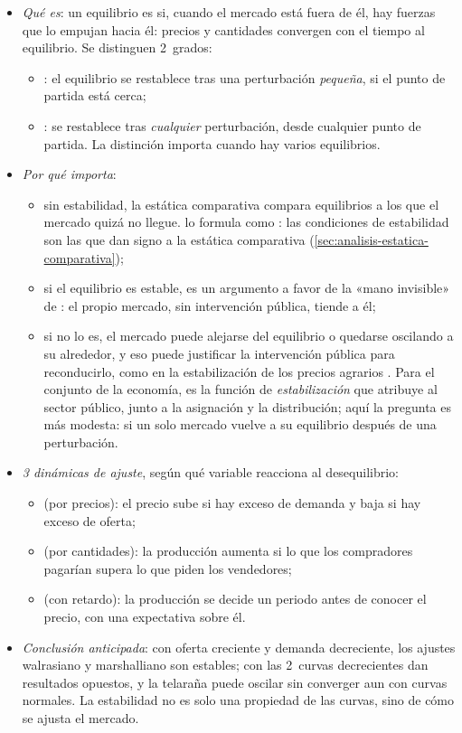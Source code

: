 \documentclass[11pt]{article}
\begin{document}
\begin{itemize}
\item \emph{Qué es}: un equilibrio es  si, cuando el mercado está fuera de él, hay fuerzas que lo empujan hacia él: precios y cantidades convergen con el tiempo al equilibrio. Se distinguen 2~grados:
  \begin{itemize}
  \item {}: el equilibrio se restablece tras una perturbación \emph{pequeña}, si el punto de partida está cerca;
  \item {}: se restablece tras \emph{cualquier} perturbación, desde cualquier punto de partida. La distinción importa cuando hay varios equilibrios.
  \end{itemize}
\item \emph{Por qué importa}:
  \begin{itemize}
  \item sin estabilidad, la estática comparativa compara equilibrios a los que el mercado quizá no llegue. \textcite{Samuelson1941Stability} lo formula como : las condiciones de estabilidad son las que dan signo a la estática comparativa (\ref{sec:analisis-estatica-comparativa});
  \item si el equilibrio es estable, es un argumento a favor de la «mano invisible» de : el propio mercado, sin intervención pública, tiende a él;
  \item si no lo es, el mercado puede alejarse del equilibrio o quedarse oscilando a su alrededor, y eso puede justificar la intervención pública para reconducirlo, como en la estabilización de los precios agrarios . Para el conjunto de la economía, es la función de \emph{estabilización} que \textcite{Musgrave1959Theory} atribuye al sector público, junto a la asignación y la distribución; aquí la pregunta es más modesta: si un solo mercado vuelve a su equilibrio después de una perturbación.
  \end{itemize}
\item \emph{3 dinámicas de ajuste}, según qué variable reacciona al desequilibrio:
  \begin{itemize}
  \item {} (por precios): el precio sube si hay exceso de demanda y baja si hay exceso de oferta;
  \item {} (por cantidades): la producción aumenta si lo que los compradores pagarían supera lo que piden los vendedores;
  \item {} (con retardo): la producción se decide un periodo antes de conocer el precio, con una expectativa sobre él.
  \end{itemize}
\item \emph{Conclusión anticipada}: con oferta creciente y demanda decreciente, los ajustes walrasiano y marshalliano son estables; con las 2~curvas decrecientes dan resultados opuestos, y la telaraña puede oscilar sin converger aun con curvas normales. La estabilidad no es solo una propiedad de las curvas, sino de cómo se ajusta el mercado.
\end{itemize}
\end{document}

